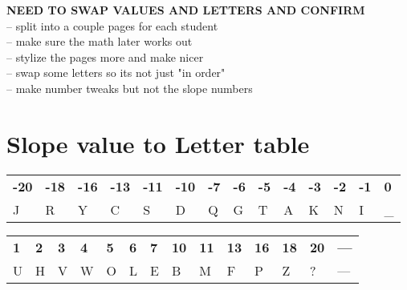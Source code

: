 \documentclass[12pt]{article}
\begin{document}
\textbf{NEED TO SWAP VALUES AND LETTERS AND CONFIRM}\\
-- split into a couple pages for each student \\
-- make sure the math later works out \\
-- stylize the pages more and make nicer \\ 
-- swap some letters so its not just "in order" \\
-- make number tweaks but not the slope numbers \\
\section*{Slope value to Letter table}
\noindent %
\begin{tabularx}{\textwidth}{|*{14}{W|}} %
\hline
\textbf{-20} & \textbf{-18} & \textbf{-16} & \textbf{-13} & \textbf{-11} & \textbf{-10} & \textbf{-7} & \textbf{-6} & \textbf{-5} & \textbf{-4} & \textbf{-3} & \textbf{-2} & \textbf{-1} & \textbf{0} \\
J & R & Y & C & S & D & Q & G & T & A & K & N & I & \_ \\
\hline
\end{tabularx}

\vspace{1em} %

\noindent
\begin{tabularx}{\textwidth}{|*{14}{W|}} %
\hline
\textbf{1} & \textbf{2} & \textbf{3} & \textbf{4} & \textbf{5} & \textbf{6} & \textbf{7} & \textbf{10} & \textbf{11} & \textbf{13} & \textbf{16} & \textbf{18} & \textbf{20} & \textbf{---} \\
U & H & V & W & O & L & E & B & M & F & P & Z & ? & --- \\
\hline
\end{tabularx}
\renewcommand{\labelenumi}{\#\arabic{enumi}}
\vspace{10cm}
\end{document}
